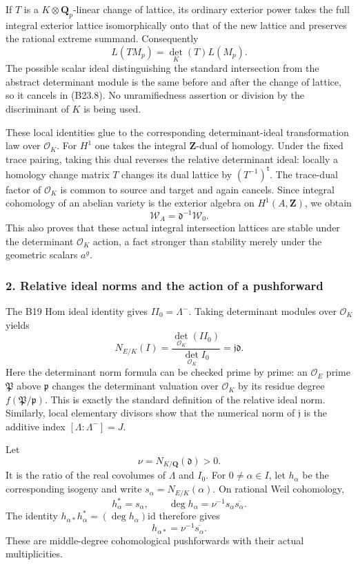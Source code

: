 If \(T\) is a \(K\otimes\mathbf Q_p\)-linear change of lattice, its ordinary exterior power takes the full integral exterior lattice isomorphically onto that of the new lattice and preserves the rational extreme summand. Consequently \[
 L(TM_p)=\det_K(T)L(M_p).
\tag{B23.8}
\] The possible scalar ideal distinguishing the standard intersection from the abstract determinant module is the same before and after the change of lattice, so it cancels in (B23.8). No unramifiedness assertion or division by the discriminant of \(K\) is being used.

These local identities glue to the corresponding determinant-ideal transformation law over \(\mathcal O_K\). For \(H^1\) one takes the integral \(\mathbf Z\)-dual of homology. Under the fixed trace pairing, taking this dual reverses the relative determinant ideal: locally a homology change matrix \(T\) changes its dual lattice by \((T^{-1})^{\mathsf t}\). The trace-dual factor of \(\mathcal O_K\) is common to source and target and again cancels. Since integral cohomology of an abelian variety is the exterior algebra on \(H^1(A,\mathbf Z)\), we obtain \[
 \mathscr W_A=\mathfrak d^{-1}\mathscr W_0.
\] This also proves that these actual integral intersection lattices are stable under the determinant \(\mathcal O_K\) action, a fact stronger than stability merely under the geometric scalars \(a^g\).

\subsubsection{2. Relative ideal norms and the action of a pushforward}\label{relative-ideal-norms-and-the-action-of-a-pushforward}

The B19 Hom ideal identity gives \(II_0=\Lambda^-\). Taking determinant modules over \(\mathcal O_K\) yields \[
 N_{E/K}(I)=\frac{\det_{\mathcal O_K}(II_0)}
                    {\det_{\mathcal O_K}I_0}
 =\mathfrak j\mathfrak d.
\tag{B23.9}
\] Here the determinant norm formula can be checked prime by prime: an \(\mathcal O_E\) prime \(\mathfrak P\) above \(\mathfrak p\) changes the determinant valuation over \(\mathcal O_K\) by its residue degree \(f(\mathfrak P/\mathfrak p)\). This is exactly the standard definition of the relative ideal norm. Similarly, local elementary divisors show that the numerical norm of \(\mathfrak j\) is the additive index \([\Lambda:\Lambda^-]=J\).

Let \[
 \nu=N_{K/\mathbf Q}(\mathfrak d)>0.
\] It is the ratio of the real covolumes of \(\Lambda\) and \(I_0\). For \(0\ne\alpha\in I\), let \(h_\alpha\) be the corresponding isogeny and write \(s_\alpha=N_{E/K}(\alpha)\). On rational Weil cohomology, \[
 h_\alpha^*=s_\alpha,\qquad
 \deg h_\alpha=\nu^{-1}s_\alpha\overline{s_\alpha}.
\] The identity \(h_{\alpha*}h_\alpha^*=(\deg h_\alpha)\mathrm{id}\) therefore gives \[
 h_{\alpha*}=\nu^{-1}\overline{s_\alpha}.
\tag{B23.10}
\] These are middle-degree cohomological pushforwards with their actual multiplicities.

